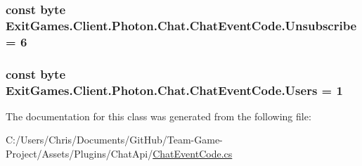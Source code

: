 \subsubsection[{\texorpdfstring{Unsubscribe}{Unsubscribe}}]{\setlength{\rightskip}{0pt plus 5cm}const byte Exit\+Games.\+Client.\+Photon.\+Chat.\+Chat\+Event\+Code.\+Unsubscribe = 6}\hypertarget{class_exit_games_1_1_client_1_1_photon_1_1_chat_1_1_chat_event_code_a9746eb3bc69c51490ee9834efa47c74f}{}\label{class_exit_games_1_1_client_1_1_photon_1_1_chat_1_1_chat_event_code_a9746eb3bc69c51490ee9834efa47c74f}
\subsubsection[{\texorpdfstring{Users}{Users}}]{\setlength{\rightskip}{0pt plus 5cm}const byte Exit\+Games.\+Client.\+Photon.\+Chat.\+Chat\+Event\+Code.\+Users = 1}\hypertarget{class_exit_games_1_1_client_1_1_photon_1_1_chat_1_1_chat_event_code_a8aac3f985184cfbe4e228510d8f94c86}{}\label{class_exit_games_1_1_client_1_1_photon_1_1_chat_1_1_chat_event_code_a8aac3f985184cfbe4e228510d8f94c86}


The documentation for this class was generated from the following file\+:\begin{DoxyCompactItemize}
\item 
C\+:/\+Users/\+Chris/\+Documents/\+Git\+Hub/\+Team-\/\+Game-\/\+Project/\+Assets/\+Plugins/\+Chat\+Api/\hyperlink{_chat_event_code_8cs}{Chat\+Event\+Code.\+cs}\end{DoxyCompactItemize}
